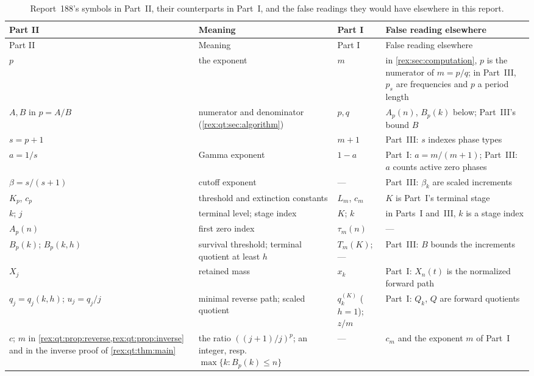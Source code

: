 {\small
\renewcommand{\arraystretch}{1.1}
\setlength{\LTcapwidth}{\textwidth}
\begin{longtable}{@{}>{\raggedright\arraybackslash}p{}>{\raggedright\arraybackslash}p{}>{\raggedright\arraybackslash}p{}>{\raggedright\arraybackslash}p{}@{}}
\caption{Report~188's symbols in Part~II, their counterparts in Part~I,
and the false readings they would have elsewhere in this
report.}\label{rex:qt:tab:notation}\\
\toprule
Part II & Meaning & Part I & False reading elsewhere\\
\midrule
\endfirsthead
\toprule
Part II & Meaning & Part I & False reading elsewhere\\
\midrule
\endhead
\bottomrule
\endfoot
$p$ & the exponent & $m$ & in \cref{rex:sec:computation}, $p$ is the numerator of $m=p/q$; in Part~III, $p_s$ are frequencies and $p$ a period length\\
$A,B$ in $p=A/B$ & numerator and denominator (\cref{rex:qt:sec:algorithm}) & $p,q$ & $A_p(n)$, $B_p(k)$ below; Part~III's bound $B$\\
$s=p+1$ & & $m+1$ & Part~III: $s$ indexes phase types\\
$a=1/s$ & Gamma exponent & $1-a$ & Part~I: $a=m/(m+1)$; Part~III: $a$ counts active zero phases\\
$\beta=s/(s+1)$ & cutoff exponent & --- & Part~III: $\beta_k$ are scaled increments\\
$K_p$, $c_p$ & threshold and extinction constants & $L_m$, $c_m$ & $K$ is Part~I's terminal stage\\
$k$; $j$ & terminal level; stage index & $K$; $k$ & in Parts~I and~III, $k$ is a stage index\\
$A_p(n)$ & first zero index & $\tau_m(n)$ & ---\\
$B_p(k)$; $B_p(k,h)$ & survival threshold; terminal quotient at least $h$ & $T_m(K)$; --- & Part~III: $B$ bounds the increments\\
$X_j$ & retained mass & $x_k$ & Part~I: $X_n(t)$ is the normalized forward path\\
$q_j=q_j(k,h)$; $u_j=q_j/j$ & minimal reverse path; scaled quotient & $q_k^{(K)}$ ($h=1$); $z/m$ & Part~I: $Q_k$, $Q$ are forward quotients\\
$c$; $m$ in \cref{rex:qt:prop:reverse,rex:qt:prop:inverse} and in the inverse proof of \cref{rex:qt:thm:main} & the ratio $((j+1)/j)^p$; an integer, resp.\ $\max\{k:B_p(k)\le n\}$ & --- & $c_m$ and the exponent $m$ of Part~I\\

\end{longtable}}
